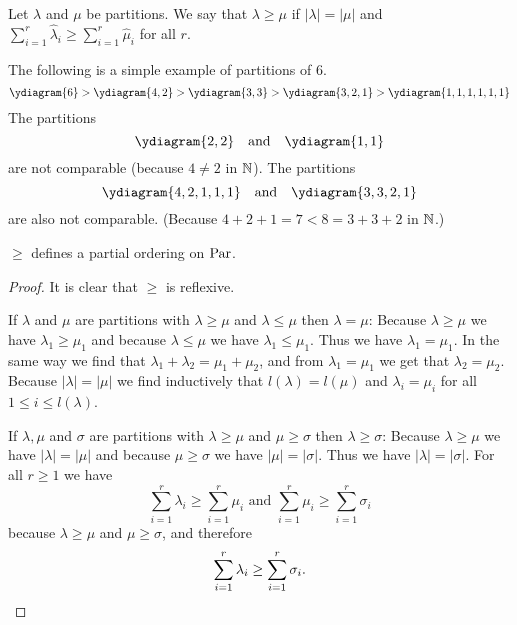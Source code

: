 \begin{defi}
  Let $\lambda$ and $\mu$ be partitions.
  We say that $\lambda \geq \mu$ if $|\lambda| = |\mu|$ and $\sum_{i=1}^r \hat{\lambda}_i \geq \sum_{i=1}^r \hat{\mu}_i$ for all $r$.
\end{defi}


\begin{expls}
  The following is a simple example of partitions of $6$.
  \[
      \ydiagram{6}
    > \ydiagram{4,2}
    > \ydiagram{3,3}
    > \ydiagram{3,2,1}
    > \ydiagram{1,1,1,1,1,1}
  \]
  The partitions
  \[
    \ydiagram{2,2}
    \quad \text{and} \quad
    \ydiagram{1,1}
  \]
  are not comparable (because $4 \neq 2$ in $\mathbb{N}$). The partitions
  \[
    \ydiagram{4,2,1,1,1}
    \quad \text{and} \quad
    \ydiagram{3,3,2,1}
  \]
  are also not comparable.
  (Because $4+2+1 = 7 < 8 = 3+3+2$ in $\mathbb{N}$.)
\end{expls}

\begin{lem}
  $\geq$ defines a partial ordering on $\operatorname{Par}$.
\end{lem}
\begin{proof}
  It is clear that $\geq$ is reflexive.
  
  If $\lambda$ and $\mu$ are partitions with $\lambda \geq \mu$ and $\lambda \leq \mu$ then $\lambda = \mu$:
  Because $\lambda \geq \mu$ we have $\lambda_1 \geq \mu_1$ and because $\lambda \leq \mu$ we have $\lambda_1 \leq \mu_1$.
  Thus we have $\lambda_1 = \mu_1$.
  In the same way we find that $\lambda_1 + \lambda_2 = \mu_1 + \mu_2$, and from $\lambda_1 = \mu_1$ we get that $\lambda_2 = \mu_2$.
  Because $|\lambda| = |\mu|$ we find inductively that $l(\lambda) = l(\mu)$ and $\lambda_i = \mu_i$ for all $1 \leq i \leq l(\lambda)$.
  
  If $\lambda, \mu$ and $\sigma$ are partitions with $\lambda \geq \mu$ and $\mu \geq \sigma$ then $\lambda \geq \sigma$:
  Because $\lambda \geq \mu$ we have $|\lambda| = |\mu|$ and because $\mu \geq \sigma$ we have $|\mu| = |\sigma|$.
  Thus we have $|\lambda| = |\sigma|$.
  For all $r \geq 1$ we have
  \[
          \sum_{i=1}^r \lambda_i
    \geq  \sum_{i=1}^r \mu_i
    \text{ and }
          \sum_{i=1}^r \mu_i
    \geq  \sum_{i=1}^r \sigma_i
  \]
  because $\lambda \geq \mu$ and $\mu \geq \sigma$, and therefore
  \[
          \sum_{i=1}^r \lambda_i
    \geq  \sum_{i=1}^r \sigma_i.
    \qedhere
  \]
\end{proof}


